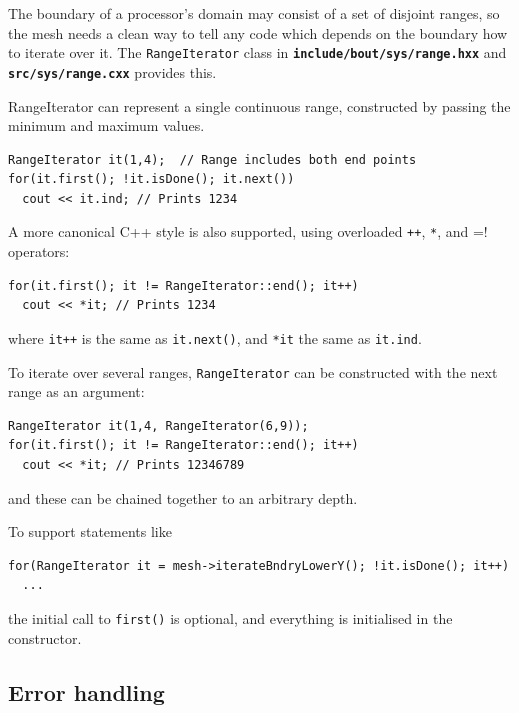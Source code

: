 \documentclass[12pt]{article}
\newcommand{\file}[1]{\texttt{\bf #1}}
\begin{document}
The boundary of a processor's domain may consist of a set of disjoint ranges, so 
the mesh needs a clean way to tell any code which depends on the boundary how to iterate over it.
The \lstinline!RangeIterator! class in \file{include/bout/sys/range.hxx} and \file{src/sys/range.cxx}
provides this.

RangeIterator can represent a single continuous range, constructed by passing
the minimum and maximum values. 
\begin{lstlisting}
RangeIterator it(1,4);  // Range includes both end points
for(it.first(); !it.isDone(); it.next())
  cout << it.ind; // Prints 1234
\end{lstlisting}

A more canonical C++ style is also supported, using overloaded \lstinline!++!, \lstinline!*!, and \lstinline!!=!
operators:
\begin{lstlisting}
for(it.first(); it != RangeIterator::end(); it++)
  cout << *it; // Prints 1234
\end{lstlisting}
where \lstinline!it++! is the same as \lstinline!it.next()!, and \lstinline!*it! the same as \lstinline!it.ind!.

To iterate over several ranges, \lstinline!RangeIterator! can be constructed with the next range as an
argument:
\begin{lstlisting}
RangeIterator it(1,4, RangeIterator(6,9));
for(it.first(); it != RangeIterator::end(); it++)
  cout << *it; // Prints 12346789
\end{lstlisting}
and these can be chained together to an arbitrary depth.

To support statements like
\begin{lstlisting}
for(RangeIterator it = mesh->iterateBndryLowerY(); !it.isDone(); it++)
  ...
\end{lstlisting}
the initial call to \lstinline!first()! is optional, and everything is initialised in the constructor.


\subsection{Error handling}






\printindex
\end{document}

